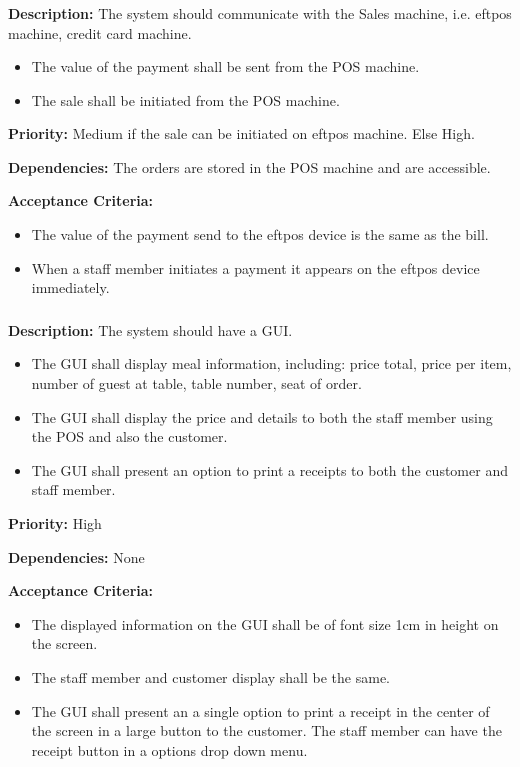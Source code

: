 \documentclass{article}
\begin{document}
\subsubsection{}
\textbf{Description:} The system should communicate with the Sales machine, i.e. eftpos machine, credit card machine.
\begin{itemize}
    \item The value of the payment shall be sent from the POS machine.
    \item The sale shall be initiated from the POS machine.
\end{itemize}


\textbf{Priority:} Medium if the sale can be initiated on eftpos machine. Else High.


\textbf{Dependencies:} The orders are stored in the POS machine and are accessible.


\textbf{Acceptance Criteria:} \begin{itemize}
    \item The value of the payment send to the eftpos device is the same as the bill.
    \item When a staff member initiates a payment it appears on the eftpos device immediately.
\end{itemize}

\subsubsection{}
\textbf{Description:} The system should have a GUI.
\begin{itemize}
    \item The GUI shall display meal information, including: price total, price per item, number of guest at table, table number, seat of order.
    \item The GUI shall display the price and details to both the staff member using the POS and also the customer.
    \item The GUI shall present an option to print a receipts to both the customer and staff member.
\end{itemize}


\textbf{Priority:} High


\textbf{Dependencies:} None


\textbf{Acceptance Criteria:} 
\begin{itemize}
    \item The displayed information on the GUI shall be of font size 1cm in height on the screen. 
    \item The staff member and customer display shall be the same.
    \item The GUI shall present an a single option to print a receipt in the center of the screen in a large button to the customer. The staff member can have the receipt button in a options drop down menu. 
\end{itemize}
\end{document}
